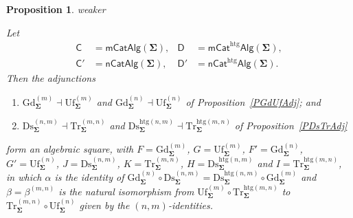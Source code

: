 \documentclass[a4paper, reqno]{amsbook}
\makeatletter
\newcommand{\sig}[1]{\mathbf{#1}}             %
\newcommand{\htg}{\mathrm{htg}}                %
\newcommand{\Gd}{\mathrm{Gd}}
\newcommand{\Uf}{\mathrm{Uf}}
\newcommand{\Ds}{\mathrm{Ds}}
\newcommand{\Tr}{\mathrm{Tr}}
\theoremstyle{plain}
\newtheorem{proposition}[theorem]{Proposition}
\theoremstyle{definition}
\newcommand*{\CA@leanpending}{}
\newcommand*{\CA@leanrelation}{}
\newcommand*{\lean}[2]{%
  \ifcsname\string\color@lean@#1\endcsname\else
    \PackageError{main}{Unknown relation `#1' in \string\lean}{Use equivalent, weaker or stronger.}%
  \fi
  \gdef\CA@leanrelation{#1}%
  \gdef\CA@leanpending{#2}}
\makeatother
\begin{document}
\begin{proposition}\label{PAlgSquareFinite}\lean{weaker}{Dimensions.dimensionAlgebraicSquare}
Let
$$
\begin{aligned}
\mathsf{C}&=\mathsf{mCatAlg}(\sig{\Sigma}), &
\mathsf{D}&=\mathsf{mCat}^{\htg}\mathsf{Alg}(\sig{\Sigma}),\\
\mathsf{C}'&=\mathsf{nCatAlg}(\sig{\Sigma}), &
\mathsf{D}'&=\mathsf{nCat}^{\htg}\mathsf{Alg}(\sig{\Sigma}).
\end{aligned}
$$
Then the adjunctions
\begin{enumerate}
\item $\Gd^{(m)}_{\sig{\Sigma}}\dashv\Uf^{(m)}_{\sig{\Sigma}}$ and $\Gd^{(n)}_{\sig{\Sigma}}\dashv\Uf^{(n)}_{\sig{\Sigma}}$ of Proposition~\ref{PGdUfAdj}; and
\item $\Ds^{(n,m)}_{\sig{\Sigma}}\dashv \Tr^{(m,n)}_{\sig{\Sigma}}$ and $\Ds^{\htg(n,m)}_{\sig{\Sigma}}\dashv \Tr^{\htg(m,n)}_{\sig{\Sigma}}$ of Proposition~\ref{PDsTrAdj}
\end{enumerate}
form an algebraic square, with $F=\Gd^{(m)}_{\sig{\Sigma}}$, $G=\Uf^{(m)}_{\sig{\Sigma}}$, $F'=\Gd^{(n)}_{\sig{\Sigma}}$, $G'=\Uf^{(n)}_{\sig{\Sigma}}$, $J=\Ds^{(n,m)}_{\sig{\Sigma}}$, $K=\Tr^{(m,n)}_{\sig{\Sigma}}$, $H=\Ds^{\htg(n,m)}_{\sig{\Sigma}}$ and $I=\Tr^{\htg(m,n)}_{\sig{\Sigma}}$, in which $\alpha$ is the identity of $\Gd^{(n)}_{\sig{\Sigma}}\circ\Ds^{(n,m)}_{\sig{\Sigma}}=\Ds^{\htg(n,m)}_{\sig{\Sigma}}\circ\Gd^{(m)}_{\sig{\Sigma}}$ and $\beta=\beta^{(m,n)}$ is the natural isomorphism from $\Uf^{(m)}_{\sig{\Sigma}}\circ \Tr^{\htg(m,n)}_{\sig{\Sigma}}$ to $\Tr^{(m,n)}_{\sig{\Sigma}}\circ\Uf^{(n)}_{\sig{\Sigma}}$ given by the $(n,m)$-identities.


\end{proposition}
\end{document}
